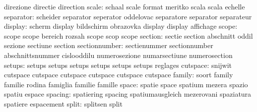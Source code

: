                            direzione                 directie
                           direction
                    scale: schaal                    scale
                           format                    meritko
                           scala                     scala
                           echelle
                separator: scheider                  separator
                           seperator                 oddelovac
                           separatore                separator
                           separateur
                  display: scherm                    display
                           bildschirm                obrazovka
                           display                   display
                           affichage
                    scope: scope                     scope
                           bereich                   rozsah
                           scope                     scop
                           scope
                  section: sectie                    section
                           abschnitt                 oddil
                           sezione                   sectiune
                           section
            sectionnumber: sectienummer              sectionnumber
                           abschnittsnummer          cislooddilu
                           numerosezione             numarsectiune
                           numerosection
                   setups: setups                    setups
                           setups                    setups
                           setups                    setups
                           reglages
                 cutspace: snijwit                   cutspace
                           cutspace                  cutspace
                           cutspace                  cutspace
                           cutspace
                   family: soort                     family
                           familie                   rodina
                           famiglia                  familie
                           famille
                    space: spatie                    space
                           spatium                   mezera
                           spazio                    spatiu
                           espace
                  spacing: spatiering                spacing
                           spatiumausgleich          mezerovani
                           spaziatura                spatiere
                           espacement
                    split: splitsen                  split

